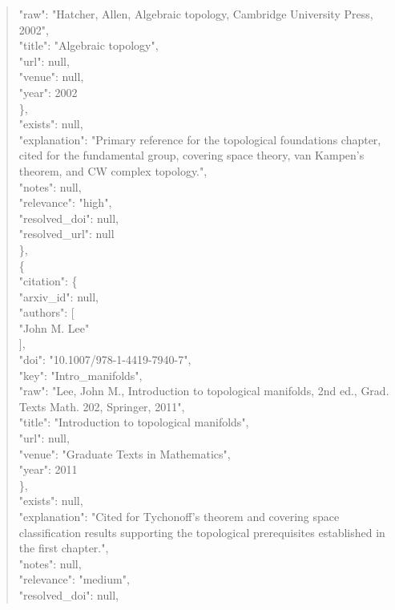 \documentclass[11pt]{article}
\begin{document}
\begin{quote}
        "raw": "Hatcher, Allen, Algebraic topology, Cambridge University Press, 2002",\\
        "title": "Algebraic topology",\\
        "url": null,\\
        "venue": null,\\
        "year": 2002\\
      \},\\
      "exists": null,\\
      "explanation": "Primary reference for the topological foundations chapter, cited for the fundamental group, covering space theory, van Kampen's theorem, and CW complex topology.",\\
      "notes": null,\\
      "relevance": "high",\\
      "resolved\_doi": null,\\
      "resolved\_url": null\\
    \},\\
    \{\\
      "citation": \{\\
        "arxiv\_id": null,\\
        "authors": [\\
          "John M. Lee"\\
        ],\\
        "doi": "10.1007/978-1-4419-7940-7",\\
        "key": "Intro\_manifolds",\\
        "raw": "Lee, John M., Introduction to topological manifolds, 2nd ed., Grad. Texts Math. 202, Springer, 2011",\\
        "title": "Introduction to topological manifolds",\\
        "url": null,\\
        "venue": "Graduate Texts in Mathematics",\\
        "year": 2011\\
      \},\\
      "exists": null,\\
      "explanation": "Cited for Tychonoff's theorem and covering space classification results supporting the topological prerequisites established in the first chapter.",\\
      "notes": null,\\
      "relevance": "medium",\\
      "resolved\_doi": null,\\

\end{quote}
\end{document}
